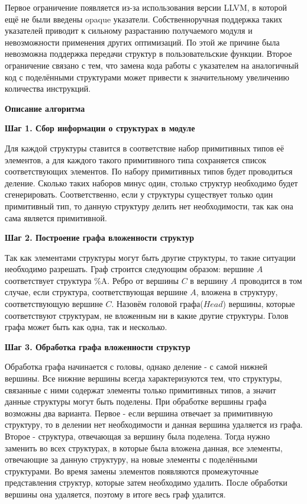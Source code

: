 Первое ограничение появляется из-за использования версии LLVM, в которой ещё не были введены opaque указатели.
Собственноручная поддержка таких указателей приводит к сильному разрастанию получаемого модуля и невозможности применения других оптимизаций.
По этой же причине была невозможна поддержка передачи структур в пользовательские функции.
Второе ограничение связано с тем, что замена кода работы с указателем на аналогичный код с поделёнными структурами может привести к значительному увеличению количества инструкций.

\textbf{Описание алгоритма}

\textbf{Шаг 1. Сбор информации о структурах в модуле}

Для каждой структуры ставится в соответствие набор примитивных типов её элементов, а для каждого такого примитивного типа сохраняется список соответствующих элементов.
По набору примитивных типов будет проводиться деление.
Сколько таких наборов минус один, столько структур необходимо будет сгенерировать.
Соответственно, если у структуры существует только один примитивный тип, то данную структуру делить нет необходимости, так как она сама является примитивной.

\textbf{Шаг 2. Построение графа вложенности структур}

Так как элементами структуры могут быть другие структуры, то такие ситуации необходимо разрешать.
Граф строится следующим образом: вершине $A$ соответствует структура \%A.
Ребро от вершины $C$ в вершину $A$ проводится в том случае, если структура, соответствующая вершине $A$, вложена в структуру, соответствующую вершине $C$.
Назовём головой графа($Head$) вершины, которые соответствуют структурам, не вложенным ни в какие другие структуры.
Голов графа может быть как одна, так и несколько.

\textbf{Шаг 3. Обработка графа вложенности структур}

Обработка графа начинается с головы, однако деление - с самой нижней вершины.
Все нижние вершины всегда характеризуются тем, что структуры, связанные с ними содержат элементы только примитивных типов, а значит данные структуры могут быть поделены.
При обработке вершины графа возможны два варианта.
Первое - если вершина отвечает за примитивную структуру, то в делении нет необходимости и данная вершина удаляется из графа.
Второе - структура, отвечающая за вершину была поделена.
Тогда нужно заменить во всех структурах, в которые была вложена данная, все элементы, отвечающие за данную структуру, на новые элементы с поделёнными структурами.
Во время замены элементов появляются промежуточные представления структур, которые затем необходимо удалить.
После обработки вершины она удаляется, поэтому в итоге весь граф удалится.


